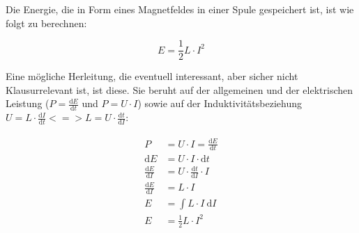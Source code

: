 

Die Energie, die in Form eines Magnetfeldes in einer Spule gespeichert ist, ist wie folgt zu berechnen:

\begin{equation} \label{eq:EnergieSpule}
	E = \frac{1}{2} L \cdot I^2
\end{equation}

Eine mögliche Herleitung, die eventuell interessant, aber sicher nicht Klausurrelevant ist, ist diese. Sie beruht auf der allgemeinen und der elektrischen Leistung ($P = \frac{\mathrm{d}E}{\mathrm{d}t}$ und $P = U \cdot I$) sowie auf der Induktivitätsbeziehung $U = L \cdot \frac{\mathrm{d}I}{\mathrm{d}t} <=> L = U \cdot \frac{\mathrm{d}t}{\mathrm{d}I}$:

\begin{align*}
\begin{split}
	P &= U \cdot I = \frac{\mathrm{d}E}{\mathrm{d}t} \\
	\mathrm{d}E &= U \cdot I \cdot \mathrm{d}t \\
	\frac{\mathrm{d}E}{\mathrm{d}I} &= U \cdot \frac{\mathrm{d}t}{\mathrm{d}I} \cdot I \\
	\frac{\mathrm{d}E}{\mathrm{d}I} &= L \cdot I \\
	E &= \int L \cdot I \ \mathrm{d}I \\
	E &= \frac{1}{2}L \cdot I^2
\end{split}
\end{align*}